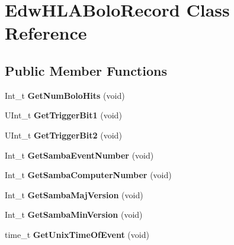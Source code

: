 \hypertarget{class_edw_h_l_a_bolo_record}{
\section{EdwHLABoloRecord Class Reference}
\label{class_edw_h_l_a_bolo_record}
}
\subsection*{Public Member Functions}
\begin{DoxyCompactItemize}
\item 
\hypertarget{class_edw_h_l_a_bolo_record_aaeec047db4ff422378f1cd1cd7aad637}{
Int\_\-t {\bfseries GetNumBoloHits} (void)}
\label{class_edw_h_l_a_bolo_record_aaeec047db4ff422378f1cd1cd7aad637}

\item 
\hypertarget{class_edw_h_l_a_bolo_record_a4872b1f904745f16023846efe4dde853}{
UInt\_\-t {\bfseries GetTriggerBit1} (void)}
\label{class_edw_h_l_a_bolo_record_a4872b1f904745f16023846efe4dde853}

\item 
\hypertarget{class_edw_h_l_a_bolo_record_aa78924ccb8e9be088c12739de1ceb635}{
UInt\_\-t {\bfseries GetTriggerBit2} (void)}
\label{class_edw_h_l_a_bolo_record_aa78924ccb8e9be088c12739de1ceb635}

\item 
\hypertarget{class_edw_h_l_a_bolo_record_a532dc648a92aa13cd9d6e9d9c48f1436}{
Int\_\-t {\bfseries GetSambaEventNumber} (void)}
\label{class_edw_h_l_a_bolo_record_a532dc648a92aa13cd9d6e9d9c48f1436}

\item 
\hypertarget{class_edw_h_l_a_bolo_record_a0c2254256944a64c190435453f8a464e}{
Int\_\-t {\bfseries GetSambaComputerNumber} (void)}
\label{class_edw_h_l_a_bolo_record_a0c2254256944a64c190435453f8a464e}

\item 
\hypertarget{class_edw_h_l_a_bolo_record_a13f3cbe28e193e236bfa31240878dede}{
Int\_\-t {\bfseries GetSambaMajVersion} (void)}
\label{class_edw_h_l_a_bolo_record_a13f3cbe28e193e236bfa31240878dede}

\item 
\hypertarget{class_edw_h_l_a_bolo_record_af210969e0095b4cebeff1612caaea322}{
Int\_\-t {\bfseries GetSambaMinVersion} (void)}
\label{class_edw_h_l_a_bolo_record_af210969e0095b4cebeff1612caaea322}

\item 
\hypertarget{class_edw_h_l_a_bolo_record_a3aef93232d9c9333c3ecd8df7ab21e4f}{
time\_\-t {\bfseries GetUnixTimeOfEvent} (void)}
\label{class_edw_h_l_a_bolo_record_a3aef93232d9c9333c3ecd8df7ab21e4f}


\end{DoxyCompactItemize}
